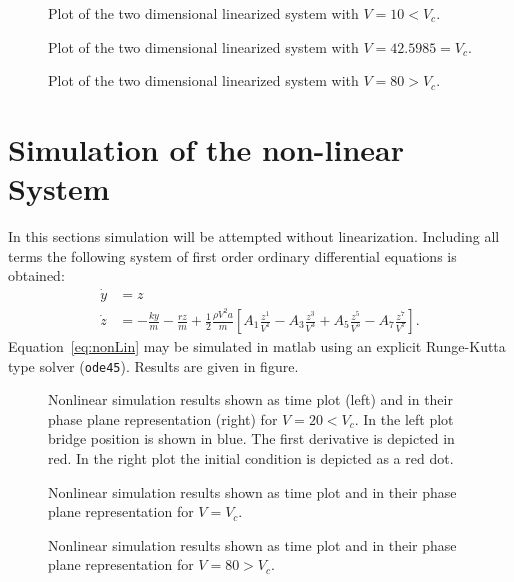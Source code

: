 \begin{figure}
\centering

\caption{Plot of the two dimensional linearized system with $V = 10 < V_c$.}

\caption{Plot of the two dimensional linearized system with $V = 42.5985 = V_c$.}

\caption{Plot of the two dimensional linearized system with $V = 80 > V_c$.}
\end{figure}




\section{Simulation of the non-linear System}
In this sections simulation will be attempted without linearization. Including all terms the following system of first order ordinary differential equations is obtained:
\begin{align}
\dot{y} &= z \\
\dot{z} &= -\frac{ky}{m} - \frac{rz}{m} + \frac{1}{2} \frac{\rho V^2 a}{m} [ A_1\frac{z^1}{V^1} - A_3 \frac{z^3}{V^3} + A_5 \frac{z^5}{V^5} - A_7 \frac{z^7}{V^7} ].
\label{eq:nonLin}
\end{align} 
Equation~\ref{eq:nonLin} may be simulated in matlab using an explicit Runge-Kutta type solver (\texttt{ode45}). Results are given in figure.
\begin{figure}


\caption{Nonlinear simulation results shown as time plot (left) and in their phase plane representation (right) for $V = 20 < V_c$. In the left plot bridge position is shown in blue. The first derivative is depicted in red. In the right plot the initial condition is depicted as a red dot.}
\end{figure}
\begin{figure}


\caption{Nonlinear simulation results shown as time plot and in their phase plane representation for $V = V_c$.}
\end{figure}
\begin{figure}


\caption{Nonlinear simulation results shown as time plot and in their phase plane representation for $V = 80 > V_c$.}
\end{figure}

